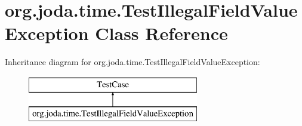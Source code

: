 \hypertarget{classorg_1_1joda_1_1time_1_1_test_illegal_field_value_exception}{\section{org.\-joda.\-time.\-Test\-Illegal\-Field\-Value\-Exception Class Reference}
\label{classorg_1_1joda_1_1time_1_1_test_illegal_field_value_exception}
}
Inheritance diagram for org.\-joda.\-time.\-Test\-Illegal\-Field\-Value\-Exception\-:\begin{figure}[H]
\begin{center}
\leavevmode
\includegraphics[height=2.000000cm]{classorg_1_1joda_1_1time_1_1_test_illegal_field_value_exception}
\end{center}
\end{figure}

